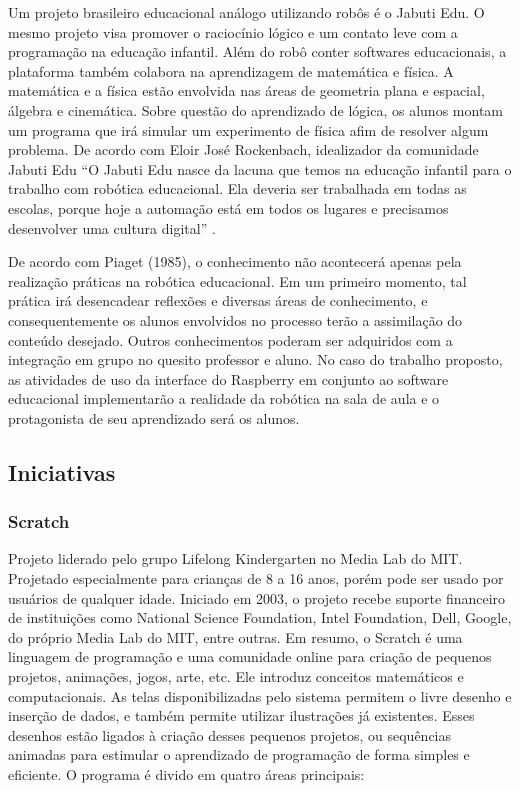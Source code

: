 Um projeto brasileiro educacional análogo utilizando robôs é o Jabuti Edu. O mesmo projeto visa promover o raciocínio lógico e um contato leve com a programação na educação infantil.  Além do robô conter softwares educacionais,  a plataforma também colabora na aprendizagem de matemática e física. A matemática e a física estão envolvida nas áreas de geometria plana e espacial, álgebra e cinemática. Sobre questão do aprendizado de lógica, os alunos montam um programa que irá simular um experimento de física afim de resolver algum problema.  De acordo com Eloir José Rockenbach, idealizador da comunidade Jabuti Edu “O Jabuti Edu nasce da lacuna que temos na educação infantil para o trabalho com robótica educacional. Ela deveria ser trabalhada em todas as escolas, porque hoje a automação está em todos os lugares e precisamos desenvolver uma cultura digital” .

De acordo com Piaget (1985), o conhecimento não acontecerá apenas pela realização práticas na robótica educacional. Em um primeiro momento, tal prática irá desencadear reflexões e diversas áreas de conhecimento, e consequentemente os alunos envolvidos no processo terão a assimilação do conteúdo desejado. Outros conhecimentos poderam ser adquiridos com a integração em grupo no quesito professor e aluno.  No caso do trabalho proposto, as atividades de uso da interface do Raspberry em conjunto ao software educacional implementarão a realidade da robótica na sala de aula e o protagonista de seu aprendizado será os alunos.

\subsection{Iniciativas}

\subsubsection{Scratch}

Projeto liderado pelo grupo Lifelong Kindergarten no Media Lab do MIT. Projetado especialmente para crianças de 8 a 16 anos, porém pode ser usado por usuários de qualquer idade. Iniciado em 2003, o projeto recebe suporte financeiro de instituições como National Science Foundation, Intel Foundation, Dell, Google, do próprio Media Lab do MIT, entre outras.
Em resumo, o Scratch é uma linguagem de programação e uma comunidade online para criação de pequenos projetos, animações, jogos, arte, etc. Ele introduz conceitos matemáticos e computacionais.
As telas disponibilizadas pelo sistema permitem o livre desenho e inserção de dados, e também permite utilizar ilustrações já existentes. Esses desenhos estão ligados à criação desses pequenos projetos, ou sequências animadas para estimular o aprendizado de programação de forma simples e eficiente.
O programa é divido em quatro áreas principais:

